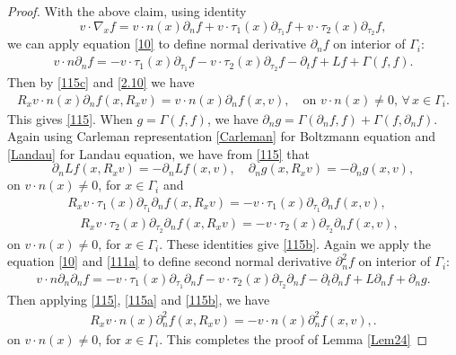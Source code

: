 \documentclass[reqno,a4paper]{amsart}
\numberwithin{equation}{section}
\newcommand{\1}{\mathbf{1}}
\newcommand{\R}{\mathbb{R}}
\newcommand{\pa}{\partial}
\newcommand{\<}{\langle}
\renewcommand{\>}{\rangle}
\begin{document}
\begin{proof}
	With the above claim, 
	using identity 
	\begin{equation}\label{111a}
		v\cdot\nabla_xf = v\cdot n(x)\partial_{n}f + v\cdot \tau_1(x)\partial_{\tau_1}f +v\cdot \tau_2(x)\partial_{\tau_2}f, 
	\end{equation} %
	we can apply equation \eqref{10} to define normal derivative $\partial_{n}f$ on interior of $\Gamma_i$:
	\begin{align*}
		v\cdot n\partial_nf = -v\cdot \tau_1(x)\partial_{\tau_1}f -v\cdot \tau_2(x)\partial_{\tau_2}f -\partial_tf +Lf +\Gamma(f,f).
	\end{align*}
	Then by \eqref{115c} and \eqref{2.10} we have 
	\begin{align*}
		R_xv\cdot n(x)\partial_{n}f(x,R_xv) = v\cdot n(x)\partial_{n}f(x,v), \quad \text{on }v\cdot n(x)\neq 0, \,\forall\,x\in\Gamma_i.
	\end{align*}This gives \eqref{115}. 
	When $g=\Gamma(f,f)$, we have $\partial_ng=\Gamma(\partial_nf,f)+\Gamma(f,\pa_nf)$. Again using Carleman representation \eqref{Carleman} for Boltzmann equation and \eqref{Landau} for Landau equation, we have from \eqref{115} that 
	\begin{equation}\label{115a}
		\partial_nLf(x,R_xv) = -\partial_nLf(x,v),\quad \partial_ng(x,R_xv) = -\partial_ng(x,v),
	\end{equation}on $v\cdot n(x)\neq 0$, for $x\in\Gamma_i$ and 
	\begin{equation*}\begin{aligned}
			R_xv\cdot \tau_1(x)\partial_{\tau_1}\partial_{n}f(x,R_xv) = -v\cdot \tau_1(x)\partial_{\tau_1}\partial_{n}f(x,v),\\ \quad R_xv\cdot \tau_2(x)\partial_{\tau_2}\partial_{n}f(x,R_xv) = -v\cdot \tau_2(x)\partial_{\tau_2}\partial_{n}f(x,v),
		\end{aligned}
	\end{equation*}on $v\cdot n(x)\neq 0$, for $x\in\Gamma_i$. These identities give \eqref{115b}. 
	Again we apply the equation \eqref{10} and \eqref{111a} to define second normal derivative $\partial^2_{n}f$ on interior of $\Gamma_i$:
	\begin{align*}
		v\cdot n\partial_n\partial_nf = -v\cdot \tau_1(x)\partial_{\tau_1}\partial_nf -v\cdot \tau_2(x)\partial_{\tau_2}\partial_nf -\partial_t\partial_nf +L\partial_nf +\pa_n g.
	\end{align*} 
	Then applying \eqref{115}, \eqref{115a} and \eqref{115b}, we have 
	\begin{align*}
		R_xv\cdot n(x)\partial^2_{n}f(x,R_xv) = -v\cdot n(x)\partial^2_{n}f(x,v), .
	\end{align*}$\text{on }v\cdot n(x)\neq 0$, for $x\in\Gamma_i$. This completes the proof of Lemma \ref{Lem24}
\end{proof}
\end{document}
